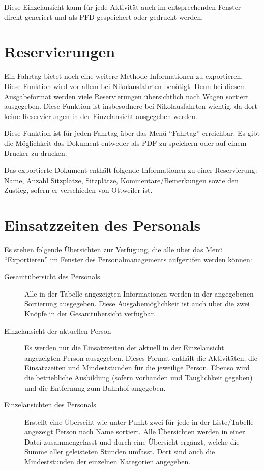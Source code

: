 Diese Einzelansicht kann für jede Aktivität auch im entsprechenden Fenster direkt generiert und als PFD gespeichert oder gedruckt werden.


\section{Reservierungen}
Ein Fahrtag bietet noch eine weitere Methode Informationen zu exportieren.
Diese Funktion wird vor allem bei Nikolausfahrten benötigt.
Denn bei diesem Ausgabeformat werden viele Reservierungen übersichtlich nach Wagen sortiert ausgegeben.
Diese Funktion ist insbesodnere bei Nikolausfahrten wichtig, da dort keine Reservierungen in der Einzelansicht ausgegeben werden.

Diese Funktion ist für jeden Fahrtag über das Menü "`Fahrtag"' erreichbar.
Es gibt die Möglichkeit das Dokument entweder als PDF zu speichern oder auf einem Drucker zu drucken.

Das exportierte Dokument enthält folgende Informationen zu einer Reservierung: Name, Anzahl Sitzplätze, Sitzplätze, Kommentare/Bemerkungen sowie den Zustieg, sofern er verschieden von Ottweiler ist.



\section{Einsatzzeiten des Personals}
Es stehen folgende Übersichten zur Verfügung, die alle über das Menü "`Exportieren"' im Fenster des Personalmanagements aufgerufen werden können:
\begin{description}
  \item[Gesamtübersicht des Personals]
  Alle in der Tabelle angezeigten Informationen werden in der angegebenen Sortierung ausgegeben.
  Diese Ausgabemöglichkeit ist auch über die zwei Knöpfe in der Gesamtübersicht verfügbar.
  \item[Einzelansicht der aktuellen Person]
  Es werden nur die Einsatzzeiten der aktuell in der Einzelansicht angezeigten Person ausgegeben.
  Dieses Format enthält die Aktivitäten, die Einsatzzeiten und Mindeststunden für die jeweilige Person.
  Ebenso wird die betriebliche Ausbildung (sofern vorhanden und Tauglichkeit gegeben) und die Entfernung zum Bahnhof angegeben.
  \item[Einzelansichten des Personals]
  Erstellt eine Übersciht wie unter Punkt zwei für jede in der Liste/Tabelle angezeigt Person nach Name sortiert.
  Alle Übersichten werden in einer Datei zusammengefasst und durch eine Übersicht ergänzt, welche die Summe aller geleisteten Stunden umfasst.
  Dort sind auch die Mindeststunden der einzelnen Kategorien angegeben.
\end{description}



